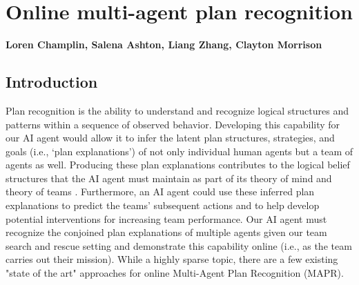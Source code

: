 \chapter{Online multi-agent plan recognition}
\label{ch:plan_recognition}
\textbf{Loren Champlin, Salena Ashton, Liang Zhang, Clayton Morrison}

\section{Introduction}

Plan recognition is the ability to understand and recognize logical structures
and patterns within a sequence of observed behavior. Developing this capability
for our AI agent would allow it to infer the latent plan structures,
strategies, and goals (i.e., `plan explanations') of not only individual human
agents but a team of agents as well. Producing these plan explanations
contributes to the logical belief structures that the AI agent must maintain as
part of its theory of mind and theory of teams
\citep{Tambe_1997,Baker_Tenenbaum_2014}. Furthermore, an AI agent could use
these inferred plan explanations to predict the teams' subsequent actions and
to help develop potential interventions for increasing team performance. Our AI
agent must recognize the conjoined plan explanations of multiple agents given
our team search and rescue setting and demonstrate this capability online
(i.e., as the team carries out their mission). While a highly sparse topic,
there are a few existing "state of the art" approaches for online Multi-Agent
Plan Recognition (MAPR).

